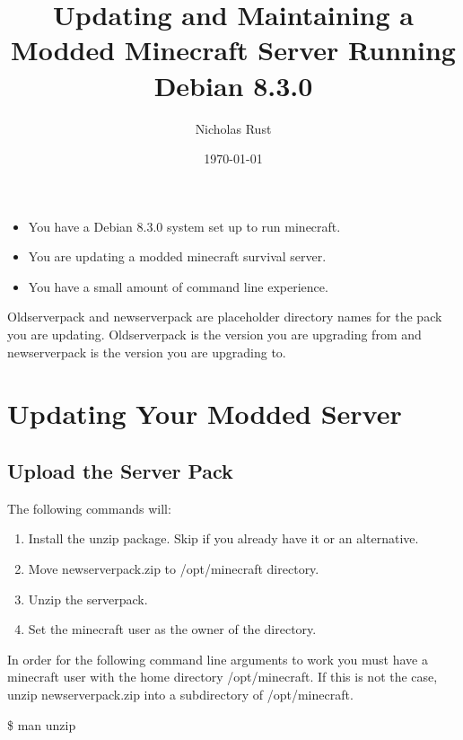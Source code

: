 \documentclass{report}
\title{Updating and Maintaining a Modded Minecraft Server Running Debian 8.3.0}
\author{Nicholas Rust}
\date{\today}
\begin{document}
\maketitle

{\hypersetup{linkcolor=black}
	\centering
	\tableofcontents
}

\pagebreak

\begin{mdframed}[style=Note, frametitle=Note: Document Use Case]
	\begin{itemize}
		\item You have a Debian 8.3.0 system set up to run minecraft. 
		\item You are updating a modded minecraft survival server.
		\item You have a small amount of command line experience.
	\end{itemize}
\end{mdframed}

\begin{mdframed}[style=Note, frametitle=Note: oldserverpack and newserverpack]
Oldserverpack and newserverpack are placeholder directory names for the pack you are updating. Oldserverpack is the version you are upgrading from and newserverpack is the version you are upgrading to.
\end{mdframed}

\chapter{Updating Your Modded Server}

\section{Upload the Server Pack}
The following commands will:
\begin{enumerate}
	\item Install the unzip package. Skip if you already have it or an alternative. 
	\item Move newserverpack.zip to /opt/minecraft directory.
	\item Unzip the serverpack.
	\item Set the minecraft user as the owner of the directory.
\end{enumerate}

\begin{mdframed}[style=Note]
In order for the following command line arguments to work you must have a minecraft user with the home directory /opt/minecraft. If this is not the case, unzip newserverpack.zip into a subdirectory of /opt/minecraft. 
	\begin{mdframed}[style=Code, frametitle=Command Line More Information on Unzip:]
	\$ man unzip
	\end{mdframed}
\end{mdframed}
\end{document}
